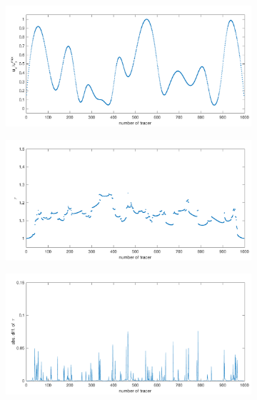 \documentclass[preprint, 10pt]{elsarticle}
\begin{document}
\begin{figure}[H]
\begin{subfigure}[b]{0.5\textwidth}
\includegraphics*[width =\linewidth]{./figs/velocity_loc100}
\caption{}
\end{subfigure}%
\begin{subfigure}[b]{0.5\textwidth}
\includegraphics*[width =\linewidth]{./figs/tort_local100}
\caption{}
\end{subfigure}
\begin{subfigure}[b]{0.5\textwidth}
\includegraphics*[width =\linewidth]{./figs/diff_tort100}
\caption{}
\end{subfigure}%
\begin{subfigure}[b]{0.5\textwidth}

\end{subfigure}
\end{figure}
\end{document}
